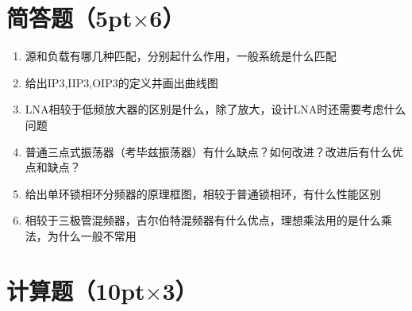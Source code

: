 \documentclass[12pt,a4paper]{ctexart}
\begin{document}
\vspace{1cm}

\section{简答题（5pt$\times$6）}

\begin{enumerate}[label=\arabic*、,leftmargin=2em]
    \item 源和负载有哪几种匹配，分别起什么作用，一般系统是什么匹配
    
    \item 给出IP3,IIP3,OIP3的定义并画出曲线图
    
    \item LNA相较于低频放大器的区别是什么，除了放大，设计LNA时还需要考虑什么问题
    
    \item 普通三点式振荡器（考毕兹振荡器）有什么缺点？如何改进？改进后有什么优点和缺点？
    
    \item 给出单环锁相环分频器的原理框图，相较于普通锁相环，有什么性能区别
    
    \item 相较于三极管混频器，吉尔伯特混频器有什么优点，理想乘法用的是什么乘法，为什么一般不常用
\end{enumerate}

\newpage

\section{计算题（10pt$\times$3）}
\end{document}
